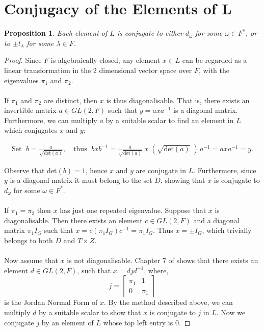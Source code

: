 \documentclass[a4paper , 11pt]{book}
\newtheorem{proposition}[theorem]{Proposition}
\theoremstyle{definition}
\theoremstyle{remark}
\begin{document}
\section[Conjugacy of the Elements of $L$]{Conjugacy of the Elements of $\pmb{L}$}

\begin{proposition}\label{6.3} Each element of $L$ is conjugate to either $d_\omega$ for some $\omega \in F^*$, or to $\pm t_\lambda$ for some $\lambda \in F$.
\end{proposition}

\begin{proof} Since $F$ is algebraically closed, any element $x \in L$ can be regarded as a linear transformation in the 2 dimensional vector space over $F$, with the eigenvalues $\pi_1$ and $\pi_2$. \\
\\
\textbullet \space If $\pi_1$ and $\pi_2$ are distinct, then $x$ is thus diagonalisable. That is, there exists an invertible matrix $a \in GL(2, F)$ such that $y = axa^{-1}$ is a diagonal matrix. Furthermore, we can multiply $a$ by a suitable scalar to find an element in $L$ which conjugates $x$ and $y$:

\begin{align*} \text{Set } \; b = \frac{a}{\sqrt {\text{det}(a)}}, \quad \text{thus } \; bxb^{-1} =\frac{a}{\sqrt {\text{det}(a)}} \; x \; (\sqrt{\text{det}(a)} \; )\,a^{-1} = axa^{-1} = y.
\end{align*}

Observe that det$(b)=1$, hence $x$ and $y$ are conjugate in $L$. Furthermore, since $y$ is a diagonal matrix it must belong to the set $D$, showing that $x$ is conjugate to $d_\omega$ for some $\omega \in F^*$. \\
\\
\textbullet \space If $\pi_1 = \pi_2$ then $x$ has just one repeated eigenvalue. Suppose that $x$ is diagonalisable. Then there exists an element $c \in GL(2, F)$ and a diagonal matrix $\pi_1 I_G$ such that $x = c(\pi_1 I_G)c^{-1} = \pi_1 I_G$. Thus $x = \pm I_G$, which trivially belongs to both $D$ and $T \times Z$. \\
\\
Now assume that $x$ is not diagonalisable. Chapter 7 of \cite{matrix} shows that there exists an element $d \in GL(2, F)$, such that $x= djd^{-1}$, where, $$j = \begin{bmatrix} \pi_1 & 1 \\ 0 & \pi_1 \end{bmatrix}$$ is the Jordan Normal Form of $x$. By the method described above, we can multiply $d$ by a suitable scalar to show that $x$ is conjugate to $j$ in $L$. Now we conjugate $j$ by an element of $L$ whose top left entry is 0.


\end{proof}
\end{document}
